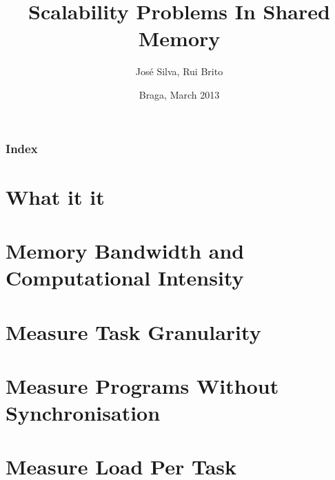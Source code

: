 \documentclass{beamer}
\title{Scalability Problems In Shared Memory}
\author{José Silva, Rui Brito}
\institute[pg22765, pg22781]{
	Universidade do Minho
}
\date{Braga, March 2013}
\begin{document}

\maketitle%

\begin{frame}
	\frametitle{Index}
	\tableofcontents
\end{frame}

\section{What it it}
\begin{frame}
	
\end{frame}

\section{Memory Bandwidth and Computational Intensity}

\section{Measure Task Granularity}

\section{Measure Programs Without Synchronisation}

\section{Measure Load Per Task}
\end{document}
